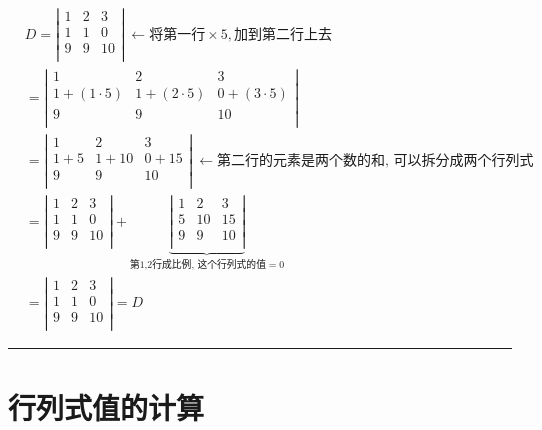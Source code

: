 \documentclass[UTF8]{ctexart}
\begin{document}
	\begin{align*}
			& D=\left| \begin{matrix}
				1&		2&		3\\
				1&		1&		0\\
				9&		9&		10\\
			\end{matrix} \right|\ ←\text{将第一行}×5,\text{加到第二行上去}\\
			& =\left| \begin{matrix}
				1&		2&		3\\
				1+\left( 1\cdot 5 \right)&		1+\left( 2\cdot 5 \right)&		0+\left( 3\cdot 5 \right)\\
				9&		9&		10\\
			\end{matrix} \right|\\
			& =\left| \begin{matrix}
				1&		2&		3\\
				1+5&		1+10&		0+15\\
				9&		9&		10\\
			\end{matrix} \right|\ ←\text{第二行的元素是两个数的和,\ 可以拆分成两个行列式}\\
			& =\left| \begin{matrix}
				1&		2&		3\\
				1&		1&		0\\
				9&		9&		10\\
			\end{matrix} \right|+\underset{\text{第1,2行成比例,\ 这个行列式的值}=0}{\underbrace{\left| \begin{matrix}
						1&		2&		3\\
						5&		10&		15\\
						9&		9&		10\\
					\end{matrix} \right|}}\\
			& =\left| \begin{matrix}
				1&		2&		3\\
				1&		1&		0\\
				9&		9&		10\\
			\end{matrix} \right|=D
	\end{align*}
	
	
	
	\hrule
	
	
	\section{行列式值的计算 }
	
\end{document}
